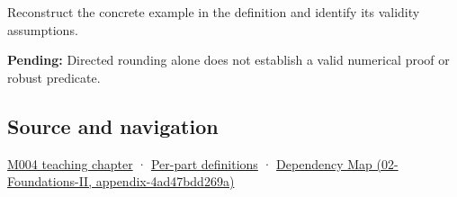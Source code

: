 Reconstruct the concrete example in the definition and identify its validity assumptions.

\textbf{Pending:} Directed rounding alone does not establish a valid numerical proof or robust predicate.

\subsection{Source and navigation}\label{appendix-1823a14330cb-source-and-navigation}

\hyperref[01-foundations-i-ch001-a-stretching-ruler-for-real-valued-quantities]{M004 teaching chapter} · \hyperref[appendix-fd090d982a15-m004---parts-61-76]{Per-part definitions} · \href{../02-Foundations-II/main.pdf\#nameddest=appendix-4ad47bdd269a}{Dependency Map (02-Foundations-II, appendix-4ad47bdd269a)}
